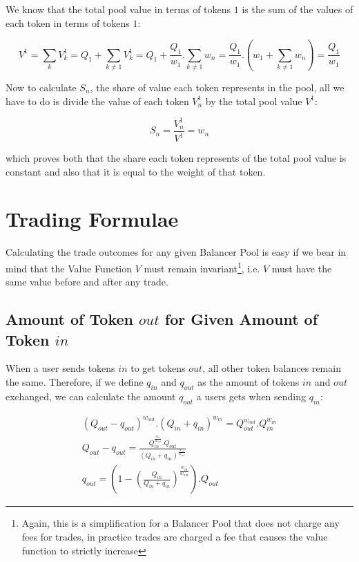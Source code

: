 \documentclass[11pt]{amsart}
\begin{document}
We know that the total pool value in terms of tokens $1$ is the sum of the values of each token in terms of tokens $1$:

\begin{equation} 
\label{equation:total_value_in_tokens1}
V^1 = \sum_{k}V^1_k = Q_{1} +\sum_{k\neq 1}V^1_k = 
Q_{1} + \frac{Q_{1}}{w_{1}}.\sum_{k\neq 1}w_n =
\frac{Q_{1}}{w_{1}}.(w_1+\sum_{k\neq 1}w_n) = \frac{Q_{1}}{w_{1}}
\end{equation}

Now to calculate $S_n$, the share of value each token represents in the pool, all we have to do is divide the value of each token $V^1_n$ by the total pool value $V^1$:

\begin{equation} 
\label{equation:total_value_in_tokens1}
S_n = \frac{V^1_n}{V^1} = w_n
\end{equation}

which proves both that the share each token represents of the total pool value is constant and also that it is equal to the weight of that token.


\section{Trading Formulae}

Calculating the trade outcomes for any given Balancer Pool is easy if we bear in mind that the Value Function $V$ must remain invariant\footnote{Again, this is a simplification for a Balancer Pool that does not charge any fees for trades, in practice trades are charged a fee that causes the value function to strictly increase}, i.e. $V$ must have the same value before and after any trade.

\subsection{Amount of Token $out$ for Given Amount of Token $in$}
When a user sends tokens $in$ to get tokens $out$, all other token balances remain the same. Therefore, if we define $q_{in}$ and $q_{out}$ as the amount of tokens $in$ and $out$ exchanged, we can calculate the amount $q_{out}$ a users gets when sending $q_{in}$:

\begin{equation}
\label{equation:q_out}
\begin{gathered}
(Q_{out}-q_{out})^{w_{out}}.(Q_{in}+q_{in})^{w_{in}} = Q_{out}^{w_{out}}.Q_{in}^{w_{in}} \\
Q_{out}-q_{out} = \frac{Q_{in}^{\frac{w_{in}}{w_{out}}}.Q_{out}}{(Q_{in}+q_{in})^{\frac{w_{in}}{w_{out}}}}\\
q_{out} = \left(1 - \left(\frac{Q_{in}}{Q_{in}+q_{in}}\right)^{\frac{w_{in}}{w_{out}}}\right).Q_{out}
\end{gathered}
\end{equation}
\end{document}
